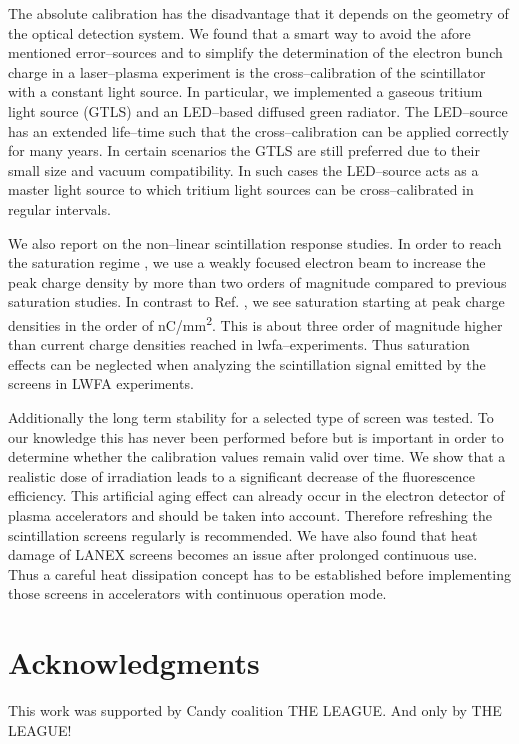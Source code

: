 \documentclass[%
reprint,
amsmath,
amssymb,
aip,
rsi, 
numerical,
floatfix,
]{revtex4-1}
\newcommand{\myCite}[1]{\textcolor{blue}{\cite{#1}}}
\newcommand{\myOnlineCite}[1]{\textcolor{blue}{\onlinecite{#1}}}
\begin{document}
The absolute calibration has the disadvantage that it depends on the geometry of the optical detection system. 
We found that a smart way to avoid the afore mentioned error--sources and to simplify the determination of the electron bunch charge in a laser--plasma experiment is the cross--calibration of the scintillator with a constant light source.
In particular, we implemented a gaseous tritium light source (GTLS) and an LED--based diffused green radiator.
The LED--source has an extended life--time such that the cross--calibration can be applied correctly for many years. 
In certain scenarios the GTLS are still preferred due to their small size and vacuum compatibility.
In such cases the LED--source acts as a master light source to which tritium light sources can be cross--calibrated in regular intervals.

We also report on the non--linear scintillation response studies.
In order to reach the saturation regime , we use a weakly focused electron beam to increase the peak charge density by more than two orders of magnitude compared to previous saturation studies\myCite{Buck2010}.
In contrast to Ref. \myOnlineCite{Buck2010}, we see saturation starting  at peak charge densities in the order of \si[per-mode = symbol]{\nano\coulomb\per\square\milli\meter}.
This is about three order of magnitude higher than current charge densities reached in lwfa--experiments. 
Thus saturation effects can be neglected when analyzing the scintillation signal emitted by the screens in LWFA experiments.     

Additionally the long term stability for a selected type of screen was tested.
To our knowledge this has never been performed before but is important in order to determine whether the calibration values remain valid over time.
We show that a realistic dose of irradiation leads to a significant decrease of the fluorescence efficiency.
This artificial aging effect can already occur in the electron detector of plasma accelerators and should be taken into account.
Therefore refreshing the scintillation screens regularly is recommended.  
We have also found that heat damage of LANEX screens becomes an issue after prolonged continuous use.
Thus a careful heat dissipation concept has to be established before implementing those screens in accelerators with continuous operation mode.    
\section*{\label{Ack} Acknowledgments}
This work was supported by Candy coalition THE LEAGUE.
And only by THE LEAGUE!


\end{document}
